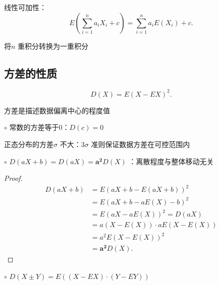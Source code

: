 \begin{notation}
     线性可加性：\[
         E\left( \sum_{i=1}^{n} a_iX_i+c \right) =\sum_{i=1}^{n} a_iE\left( X_i \right) +c
     .\] 
     
     将$n$ 重积分转换为一重积分
 \end{notation}
\subsection{方差的性质}%
\label{sub:方差的性质}
\[
    D\left( X \right) =E\left( X-EX \right) ^2
.\] 
\begin{notation}
    方差是描述数据偏离中心的程度值
\end{notation}
$\circ$ 常数的方差等于0：$D\left( c \right) =0$
\begin{notation}
    正态分布的方差$\sigma$ 不大：$3\sigma$ 准则保证数据方差在可控范围内
\end{notation}
$\circ$ $D\left( aX+b \right) =D\left( aX \right)=\bm{a^2}D\left( X \right)  $ ：离散程度与整体移动无关
\begin{proof}
    \begin{align*}
        D\left( aX+b \right) &= E\left( aX+b-E\left( aX+b \right)  \right) ^2 \\
        &= E\left( aX+b-aE\left( X \right) -b \right) ^2 \\
        &= E\left( aX-aE\left( X \right)  \right) ^2 =D\left( aX \right) \\
        &= a\left( X-E\left( X \right)  \right) \cdot aE\left( X-E\left( X \right)  \right)  \\
        &= a^2E\left( X-E(X) \right)^2 \\
        &= \bm{a^2}D\left( X \right) 
    .\end{align*}
\end{proof}
$\circ$ $D\left( X\pm Y \right) =E\left( \left( X-EX \right) \cdot \left( Y-EY \right)  \right) $
